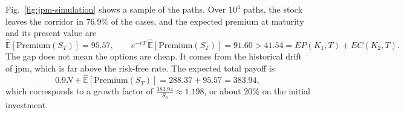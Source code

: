 Fig.~\ref{fig:jpm-simulation} shows a sample of the paths.
Over $10^4$ paths, the stock leaves the corridor in $76.9\%$ of the cases, and the expected premium at maturity and its present value are
\[
    \hat{\mathbb{E}}[\text{Premium}(S_T)] = 95.57, \qquad e^{-rT}\, \hat{\mathbb{E}}[\text{Premium}(S_T)] = 91.60 > 41.54 = EP(K_1, T) + EC(K_2, T).
\]
The gap does not mean the options are cheap. It comes from the historical drift of \gls{jpm}, which is far above the risk-free rate.
The expected total payoff is
\[
    0.9N + \hat{\mathbb{E}}[\text{Premium}(S_T)] = 288.37 + 95.57 = 383.94,
\]
which corresponds to a growth factor of $\frac{383.94}{S_0} \approx 1.198$, or about $20\%$ on the initial investment.
